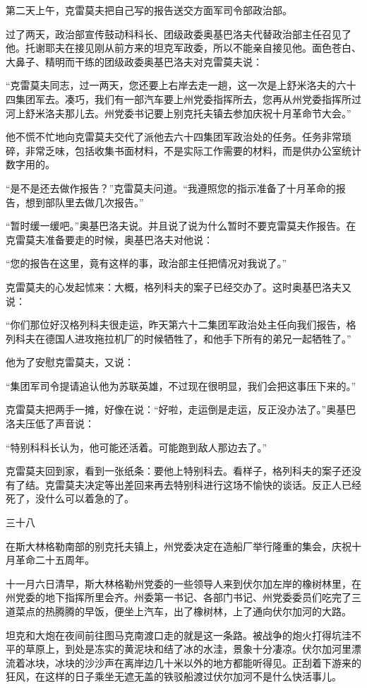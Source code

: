 第二天上午，克雷莫夫把自己写的报告送交方面军司令部政治部。

过了两天，政治部宣传鼓动科科长、团级政委奥基巴洛夫代替政治部主任召见了他。托谢耶夫在接见刚从前方来的坦克军政委，所以不能亲自接见他。面色苍白、大鼻子、精明而干练的团级政委奥基巴洛夫对克雷莫夫说：

“克雷莫夫同志，过一两天，您还要上右岸去走一趟，这一次是上舒米洛夫的六十四集团军去。凑巧，我们有一部汽车要上州党委指挥所去，您再从州党委指挥所过河上舒米洛夫那儿去。州党委书记要上别克托夫镇去参加庆祝十月革命节大会。”

他不慌不忙地向克雷莫夫交代了派他去六十四集团军政治处的任务。任务非常琐碎，非常乏味，包括收集书面材料，不是实际工作需要的材料，而是供办公室统计数字用的。

“是不是还去做作报告？”克雷莫夫问道。“我遵照您的指示准备了十月革命的报告，想到部队里去做几次报告。”

“暂时缓一缓吧。”奥基巴洛夫说。并且说了说为什么暂时不要克雷莫夫作报告。在克雷莫夫准备要走的时候，奥基巴洛夫对他说：

“您的报告在这里，竟有这样的事，政治部主任把情况对我说了。”

克雷莫夫的心发起怵来：大概，格列科夫的案子已经交办了。这时奥基巴洛夫又说：

“你们那位好汉格列科夫很走运，昨天第六十二集团军政治处主任向我们报告，格列科夫在德国人进攻拖拉机厂的时候牺牲了，和他手下所有的弟兄一起牺牲了。”

他为了安慰克雷莫夫，又说：

“集团军司令提请追认他为苏联英雄，不过现在很明显，我们会把这事压下来的。”

克雷莫夫把两手一摊，好像在说：“好啦，走运倒是走运，反正没办法了。”奥基巴洛夫压低了声音说：

“特别科科长认为，他可能还活着。可能跑到敌人那边去了。”

克雷莫夫回到家，看到一张纸条：要他上特别科去。看样子，格列科夫的案子还没有了结。克雷莫夫决定等出差回来再去特别科进行这场不愉快的谈话。反正人已经死了，没什么可以着急的了。

三十八

在斯大林格勒南部的别克托夫镇上，州党委决定在造船厂举行隆重的集会，庆祝十月革命二十五周年。

十一月六日清早，斯大林格勒州党委的一些领导人来到伏尔加左岸的橡树林里，在州党委的地下指挥所里会齐。州委第一书记、各部门书记、州党委委员们吃完了三道菜点的热腾腾的早饭，便坐上汽车，出了橡树林，上了通向伏尔加河的大路。

坦克和大炮在夜间前往图马克南渡口走的就是这一条路。被战争的炮火打得坑洼不平的草原上，到处是冻实的黄泥块和结了冰的水洼，景象十分凄凉。伏尔加河里漂流着冰块，冰块的沙沙声在离岸边几十米以外的地方都能听得见。正刮着下游来的狂风，在这样的日子乘坐无遮无盖的铁驳船渡过伏尔加河不是什么快活事儿。

